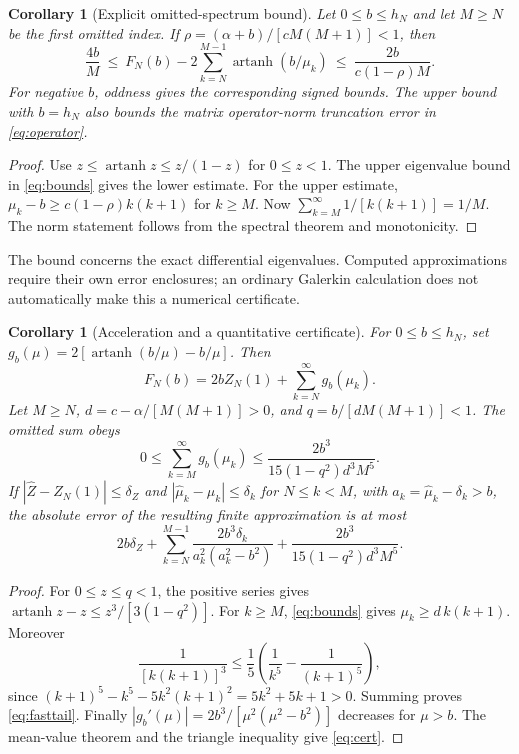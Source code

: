 \documentclass[10pt]{article}
\newtheorem{corollary}[theorem]{Corollary}
\newcommand{\artanh}{\operatorname{artanh}}
\begin{document}
\begin{corollary}[Explicit omitted-spectrum bound]
Let $0\le b\le h_N$ and let $M\ge N$ be the first omitted index.
If $\rho=(\alpha+b)/[cM(M+1)]<1$, then
\begin{equation}
\frac{4b}{M}\ \le\
F_N(b)-2\sum_{k=N}^{M-1}\artanh(b/\mu_k)
\ \le\ \frac{2b}{c(1-\rho)M}.
\label{eq:tailbound}
\end{equation}
For negative $b$, oddness gives the corresponding signed bounds.
The upper bound with $b=h_N$ also bounds the matrix operator-norm
truncation error in \eqref{eq:operator}.
\end{corollary}
\begin{proof}
Use $z\le\artanh z\le z/(1-z)$ for $0\le z<1$.
The upper eigenvalue bound in \eqref{eq:bounds} gives the lower
estimate. For the upper estimate,
$\mu_k-b\ge c(1-\rho)k(k+1)$ for $k\ge M$.
Now $\sum_{k=M}^\infty1/[k(k+1)]=1/M$.
The norm statement follows from the spectral theorem and monotonicity.
\end{proof}
The bound concerns the exact differential eigenvalues. Computed
approximations require their own error enclosures; an ordinary
Galerkin calculation does not automatically make this a numerical certificate.

\begin{corollary}[Acceleration and a quantitative certificate]
For $0\le b\le h_N$, set $g_b(\mu)=2[\artanh(b/\mu)-b/\mu]$.
Then
\begin{equation}
F_N(b)=2bZ_N(1)+\sum_{k=N}^\infty g_b(\mu_k).
\label{eq:accelerate}
\end{equation}
Let $M\ge N$, $d=c-\alpha/[M(M+1)]>0$, and
$q=b/[dM(M+1)]<1$. The omitted sum obeys
\begin{equation}
0\le \sum_{k=M}^\infty g_b(\mu_k)
\le \frac{2b^3}{15(1-q^2)d^3M^5}.
\label{eq:fasttail}
\end{equation}
If $|\widehat Z-Z_N(1)|\le\delta_Z$ and
$|\widehat\mu_k-\mu_k|\le\delta_k$ for $N\le k<M$, with
$a_k=\widehat\mu_k-\delta_k>b$, the absolute error of the resulting
finite approximation is at most
\begin{equation}
2b\delta_Z+
\sum_{k=N}^{M-1}\frac{2b^3\delta_k}{a_k^2(a_k^2-b^2)}
+\frac{2b^3}{15(1-q^2)d^3M^5}.
\label{eq:cert}
\end{equation}
\end{corollary}
\begin{proof}
For $0\le z\le q<1$, the positive series gives
$\artanh z-z\le z^3/[3(1-q^2)]$.
For $k\ge M$, \eqref{eq:bounds} gives $\mu_k\ge d\,k(k+1)$.
Moreover
\[
\frac1{[k(k+1)]^3}\le\frac15
\left(\frac1{k^5}-\frac1{(k+1)^5}\right),
\]
since $(k+1)^5-k^5-5k^2(k+1)^2=5k^2+5k+1>0$.
Summing proves \eqref{eq:fasttail}.
Finally $|g_b'(\mu)|=2b^3/[\mu^2(\mu^2-b^2)]$ decreases for $\mu>b$.
The mean-value theorem and the triangle inequality give \eqref{eq:cert}.
\end{proof}
\end{document}
